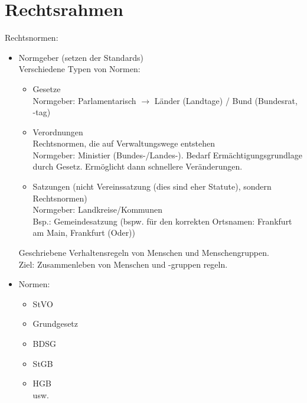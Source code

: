 \section{Rechtsrahmen}
Rechtsnormen:
\begin{itemize}
\item Normgeber (setzen der Standards)\\
Verschiedene Typen von Normen:
\begin{itemize}
\item Gesetze\\
Normgeber: Parlamentarisch $\to$ Länder (Landtage) / Bund (Bundesrat, -tag)
\item Verordnungen\\
Rechtsnormen, die auf Verwaltungswege entstehen\\
Normgeber: Ministier (Bundes-/Landes-). Bedarf Ermächtigungsgrundlage durch Gesetz. Ermöglicht dann schnellere Veränderungen.
\item Satzungen (nicht Vereinssatzung (dies sind eher Statute), sondern Rechtsnormen)\\
Normgeber: Landkreise/Kommunen\\
Bsp.: Gemeindesatzung (bspw. für den korrekten Ortsnamen: Frankfurt am Main, Frankfurt (Oder))
\end{itemize}
Geschriebene Verhaltensregeln von Menschen und Menschengruppen.\\
Ziel: Zusammenleben von Menschen und -gruppen regeln.
\item Normen:
\begin{itemize}
\item StVO
\item Grundgesetz
\item BDSG
\item StGB
\item HGB\\
usw.
\end{itemize}
\end{itemize}
